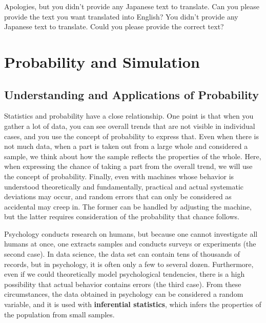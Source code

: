\documentclass[
  a4paper,
]{book}
\begin{document}
Apologies, but you didn't provide any Japanese text to translate. Can
you please provide the text you want translated into English? You didn't
provide any Japanese text to translate. Could you please provide the
correct text?


\chapter{Probability and Simulation}\label{probability-and-simulation}

\section{Understanding and Applications of
Probability}\label{understanding-and-applications-of-probability}

Statistics and probability have a close relationship. One point is that
when you gather a lot of data, you can see overall trends that are not
visible in individual cases, and you use the concept of probability to
express that. Even when there is not much data, when a part is taken out
from a large whole and considered a sample, we think about how the
sample reflects the properties of the whole. Here, when expressing the
chance of taking a part from the overall trend, we will use the concept
of probability. Finally, even with machines whose behavior is understood
theoretically and fundamentally, practical and actual systematic
deviations may occur, and random errors that can only be considered as
accidental may creep in. The former can be handled by adjusting the
machine, but the latter requires consideration of the probability that
chance follows.

Psychology conducts research on humans, but because one cannot
investigate all humans at once, one extracts samples and conducts
surveys or experiments (the second case). In data science, the data set
can contain tens of thousands of records, but in psychology, it is often
only a few to several dozen. Furthermore, even if we could theoretically
model psychological tendencies, there is a high possibility that actual
behavior contains errors (the third case). From these circumstances, the
data obtained in psychology can be considered a random variable, and it
is used with \textbf{inferential statistics}, which infers the
properties of the population from small samples.
\end{document}
